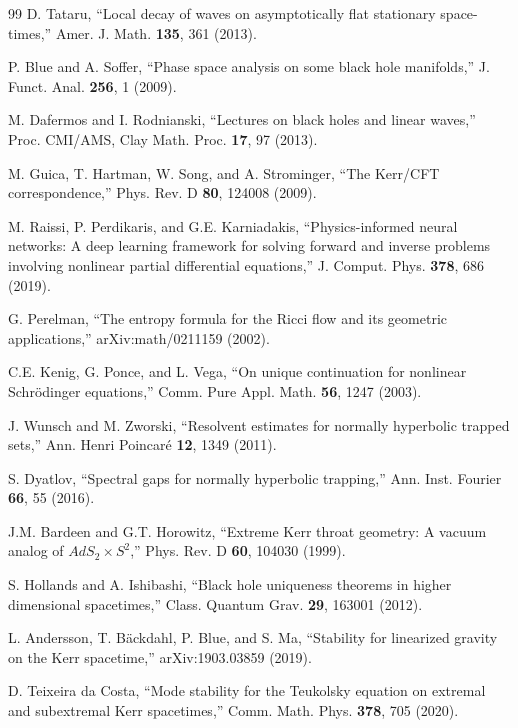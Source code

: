 \documentclass[12pt,a4paper]{article}
\begin{document}
\begin{thebibliography}{99}
D. Tataru, ``Local decay of waves on asymptotically flat stationary space-times,'' Amer. J. Math. \textbf{135}, 361 (2013).

P. Blue and A. Soffer, ``Phase space analysis on some black hole manifolds,'' J. Funct. Anal. \textbf{256}, 1 (2009).

M. Dafermos and I. Rodnianski, ``Lectures on black holes and linear waves,'' Proc. CMI/AMS, Clay Math. Proc. \textbf{17}, 97 (2013).

M. Guica, T. Hartman, W. Song, and A. Strominger, ``The Kerr/CFT correspondence,'' Phys. Rev. D \textbf{80}, 124008 (2009).

M. Raissi, P. Perdikaris, and G.E. Karniadakis, ``Physics-informed neural networks: A deep learning framework for solving forward and inverse problems involving nonlinear partial differential equations,'' J. Comput. Phys. \textbf{378}, 686 (2019).

G. Perelman, ``The entropy formula for the Ricci flow and its geometric applications,'' arXiv:math/0211159 (2002).

C.E. Kenig, G. Ponce, and L. Vega, ``On unique continuation for nonlinear Schrödinger equations,'' Comm. Pure Appl. Math. \textbf{56}, 1247 (2003).

J. Wunsch and M. Zworski, ``Resolvent estimates for normally hyperbolic trapped sets,'' Ann. Henri Poincaré \textbf{12}, 1349 (2011).

S. Dyatlov, ``Spectral gaps for normally hyperbolic trapping,'' Ann. Inst. Fourier \textbf{66}, 55 (2016).

J.M. Bardeen and G.T. Horowitz, ``Extreme Kerr throat geometry: A vacuum analog of $AdS_2 \times S^2$,'' Phys. Rev. D \textbf{60}, 104030 (1999).

S. Hollands and A. Ishibashi, ``Black hole uniqueness theorems in higher dimensional spacetimes,'' Class. Quantum Grav. \textbf{29}, 163001 (2012).

L. Andersson, T. Bäckdahl, P. Blue, and S. Ma, ``Stability for linearized gravity on the Kerr spacetime,'' arXiv:1903.03859 (2019).

D. Teixeira da Costa, ``Mode stability for the Teukolsky equation on extremal and subextremal Kerr spacetimes,'' Comm. Math. Phys. \textbf{378}, 705 (2020).


\end{thebibliography}
\end{document}
